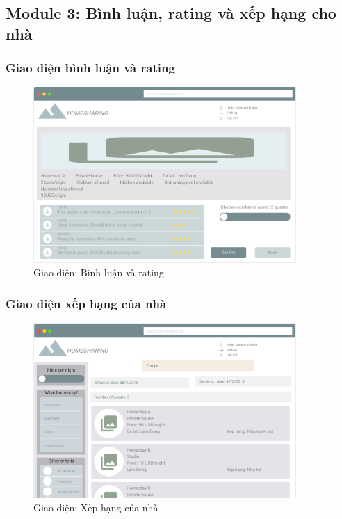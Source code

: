 \newpage
\subsection{Module 3: Bình luận, rating và xếp hạng cho nhà}
\subsubsection{Giao diện bình luận và rating}
\begin{figure}[H]
	\centering
	\includegraphics[width=10cm]{parts/Khoa/khoa_ui/1b.png}
	\vspace{0.5cm}
	\caption{Giao diện: Bình luận và rating}
\end{figure}

\subsubsection{Giao diện xếp hạng của nhà}
\begin{figure}[H]
	\centering
	\includegraphics[width=10cm]{Image/ui-ngoctin.png}
	\vspace{0.5cm}
	\caption{Giao diện: Xếp hạng của nhà}
\end{figure}